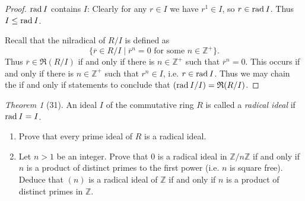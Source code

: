 \documentclass[12pt]{article}
\theoremstyle{remark}
\theoremstyle{named}
\newtheorem*{theorem}{Theorem}
\newcommand{\Z}{\mathbb Z}
\newcommand{\rad}{\text{rad}\hspace*{0.7mm}}
\begin{document}
\begin{proof}
    \(\rad I\) contains \(I\): Clearly for any \(r \in I\) we have \(r^1 \in I\), so \(r \in \rad I\). Thus \(I \le \rad I\).

    Recall that the nilradical of \(R / I\) is defined as
    \[\{\overline{r} \in R / I \mid \overline{r}^n = 0 \text{ for some } n \in \Z^+\}.\]
    Thus \(\overline{r} \in \mathfrak{R}(R / I)\) if and only if there is \(n \in \Z^+\) such that \(\overline{r}^n = 0\). This occurs if and only if there is \(n \in \Z^+\) such that \(r^n \in I\), i.e. \(r \in \rad I\). Thus we may chain the if and only if statements to conclude that \((\rad I / I) = \mathfrak{R}(R / I)\).
\end{proof}

\begin{theorem}[31]
    An ideal \(I\) of the commutative ring \(R\) is called a \textit{radical ideal} if \(\rad I = I\). 
    \begin{enumerate}
        \item Prove that every prime ideal of \(R\) is a radical ideal.
        \item Let \(n > 1\) be an integer. Prove that 0 is a radical ideal in \(\Z / n \Z\) if and only if \(n\) is a product of distinct primes to the first power (i.e. \(n\) is square free). Deduce that \((n)\) is a radical ideal of \(\Z\) if and only if \(n\) is a product of distinct primes in \(\Z\). 
    \end{enumerate}
\end{theorem}
\end{document}
